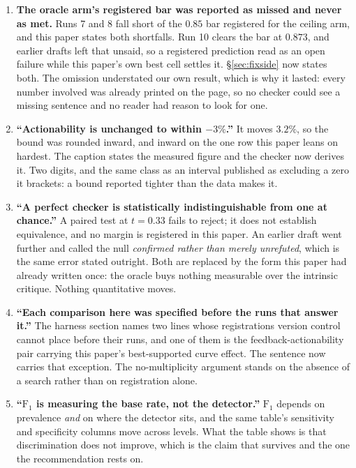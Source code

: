 \documentclass[11pt]{article}
\begin{document}
\begin{enumerate}
    a fourth restatement fails rather than going quietly unchecked.
  \item \textbf{The oracle arm's registered bar was reported as missed and never as met.} Runs 7
    and 8 fall short of the $0.85$ bar registered for the ceiling arm, and this paper states
    both shortfalls. Run 10 clears the bar at $0.873$, and earlier drafts left that unsaid, so a
    registered prediction read as an open failure while this paper's own best cell settles it.
    \S\ref{sec:fixside} now states both. The omission understated our own result, which is why it
    lasted: every number involved was already printed on the page, so no checker could see a
    missing sentence and no reader had reason to look for one.
  \item \textbf{``Actionability is unchanged to within $-3\%$.''} It moves $3.2\%$, so the
    bound was rounded inward, and inward on the one row this paper leans on hardest. The
    caption states the measured figure and the checker now derives it. Two digits, and the
    same class as an interval published as excluding a zero it brackets: a bound reported
    tighter than the data makes it.
  \item \textbf{``A perfect checker is statistically indistinguishable from one at chance.''} A
    paired test at $t = 0.33$ fails to reject; it does not establish equivalence, and no margin
    is registered in this paper. An earlier draft went further and called the null
    \emph{confirmed rather than merely unrefuted}, which is the same error stated outright. Both
    are replaced by the form this paper had already written once: the oracle buys nothing
    measurable over the intrinsic critique. Nothing quantitative moves.
  \item \textbf{``Each comparison here was specified before the runs that answer it.''} The
    harness section names two lines whose registrations version control cannot place before
    their runs, and one of them is the feedback-actionability pair carrying this paper's
    best-supported curve effect. The sentence now carries that exception. The no-multiplicity argument
    stands on the absence of a search rather than on registration alone.
  \item \textbf{``$\mathrm{F}_1$ is measuring the base rate, not the detector.''} $\mathrm{F}_1$
    depends on prevalence \emph{and} on where the detector sits, and the same table's sensitivity
    and specificity columns move across levels. What the table shows is that discrimination does
    not improve, which is the claim that survives and the one the recommendation rests on.

\end{enumerate}
\end{document}
